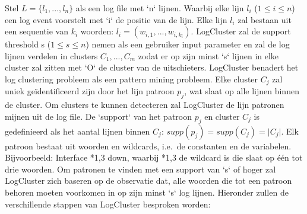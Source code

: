 Stel \(L = \{l_{1}, ..., l_{n}\}\) als een log file met `n` lijnen. Waarbij elke lijn \(l_{i}\) (\(1 \leq i \leq n\)) een log event voorstelt met `i` de positie van de lijn. Elke lijn \(l_{i}\) zal bestaan uit een sequentie van \(k_{i}\) woorden: \(l_{i} = (w_{i, 1}, ..., w_{i, k_{i}})\). LogCluster zal de support threshold s (\(1 \leq s \leq n\)) nemen als een gebruiker input parameter en zal de log lijnen verdelen in clusters \(C_{1}, ..., C_{m}\) zodat er op zijn minst `s` lijnen in elke cluster zal zitten met `O` de cluster van de uitschieters. LogCluster benadert het log clustering probleem als een pattern mining probleem. Elke cluster \(C_{j}\) zal uniek geïdentificeerd zijn door het lijn patroon \(p_{j}\), wat slaat op alle lijnen binnen de cluster. Om clusters te kunnen detecteren zal LogCluster de lijn patronen mijnen uit de log file. De `support` van het patroon \(p_{j}\) en cluster \(C_{j}\) is gedefinieerd als het aantal lijnen binnen \(C_{j}\): \(supp(p_{j}) = supp(C_{j}) = \lvert C_{j} \rvert\). Elk patroon bestaat uit woorden en wildcards, i.e.\ de constanten en de variabelen. Bijvoorbeeld: Interface *{1,3} down, waarbij *{1,3} de wildcard is die slaat op één tot drie woorden. Om patronen te vinden met een support van `s` of hoger zal LogCluster zich baseren op de observatie dat, alle woorden die tot een patroon behoren moeten voorkomen in op zijn minst `s` log lijnen. Hieronder zullen de verschillende stappen van LogCluster besproken worden:

